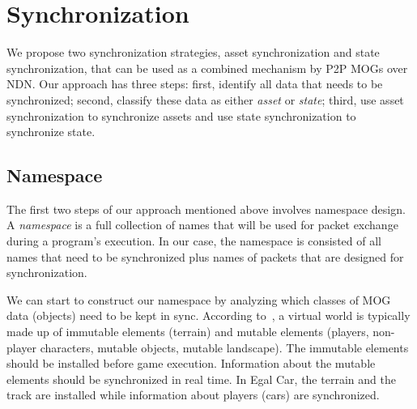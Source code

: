 \documentclass{article}
\begin{document}
\section{Synchronization}
\label{synchronization}

We propose two synchronization strategies, asset synchronization and state synchronization, that can be used as a combined mechanism by P2P MOGs over NDN. Our approach has three steps: first, identify all data that needs to be synchronized; second, classify these data as either \emph{asset} or \emph{state}; third, use asset synchronization to synchronize assets and use state synchronization to synchronize state.

\subsection{Namespace}
\label{namespace}

The first two steps of our approach mentioned above involves namespace design. A \emph{namespace} is a full collection of names that will be used for packet exchange during a program's execution. In our case, the namespace is consisted of all names that need to be synchronized plus names of packets that are designed for synchronization. 

We can start to construct our namespace by analyzing which classes of MOG data (objects) need to be kept in sync. According to~\cite{Upen}, a virtual world is typically made up of immutable elements (terrain) and mutable elements (players, non-player characters, mutable objects, mutable landscape). The immutable elements should be installed before game execution. Information about the mutable elements should be synchronized in real time. In Egal Car, the terrain and the track are installed while information about players (cars) are synchronized.
\end{document}
